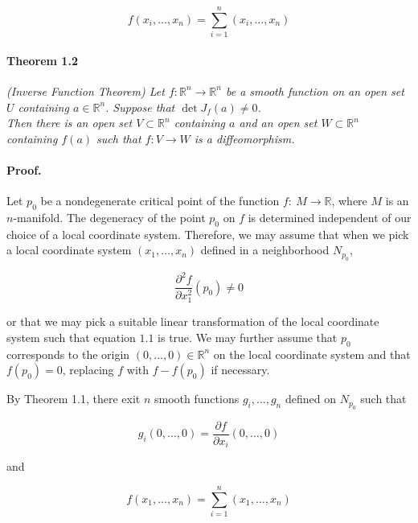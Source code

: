 \documentclass[]{article}
\begin{document}
    $$
        f(x_i,\ldots,x_n)=\sum_{i=1}^{n}{(x_i,\ldots,x_n)}
    $$

    \paragraph{\textbf{Theorem 1.2}} \textit{ (Inverse Function Theorem)
        Let $f:\mathbb{R}^n\to \mathbb{R}^n$ be a smooth function on an open set $U$
        containing $a\in\mathbb{R}^n$. Suppose that $\det J_f(a)\not = 0$.
        \\Then there is an open set $V \subset \mathbb{R}^n$ containing $a$ and an open
        set $W\subset \mathbb{R}^n$ containing $f(a)$ such that $f:V\to W$ is a 
        diffeomorphism.
    }

    \paragraph{\textbf{Proof.}} Let $p_0$ be a nondegenerate critical point of the function
     $f:\ M \to \mathbb{R}$, where $M$ is an $n$-manifold. The degeneracy of the point
     $p_0$ on $f$ is determined independent of our choice of a local coordinate system.
     Therefore, we may assume that when we pick a local coordinate system $(x_1,\ldots,x_n)$ defined
     in a neighborhood $N_{p_0}$,

     \begin{equation}
        \frac{\partial^2f}{\partial x_1^2}(p_0)\not = 0\tag{1.1}
     \end{equation}

    or that we may pick a suitable linear transformation of the local coordinate
    system such that equation $1.1$ is true. We may further assume that $p_0$ corresponds
    to the origin $(0,\ldots,0)\in \mathbb{R}^n$ on the local coordinate system and that $f(p_0)=0$,
    replacing $f$ with $f-f(p_0)$ if necessary.
    
    By Theorem 1.1, there exit $n$ smooth functions $g_i,\ldots,g_n$ defined on
    $N_{p_0}$ such that

     \begin{equation}
        g_i(0,\ldots,0)=\frac{\partial f}{\partial x_i}(0,\ldots,0) \tag{1.2}
     \end{equation}

     and

     \begin{equation}
        f(x_1,\ldots,x_n)=\sum_{i=1}^{n}{(x_1,\ldots,x_n)}\tag{1.3} 
     \end{equation}
\end{document}
